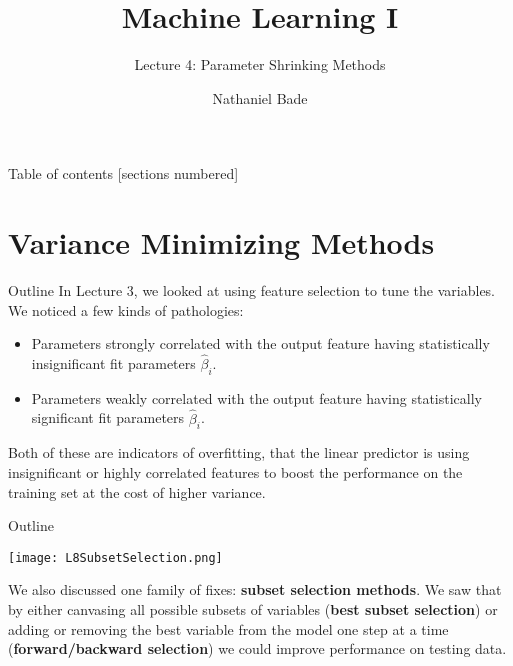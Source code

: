 \documentclass[10pt, table, dvipsnames,xcdraw,handout]{beamer}
\title{Machine Learning I}
\subtitle{Lecture 4: Parameter Shrinking Methods}
\date{}
\author{Nathaniel Bade}
\institute{Northeastern University Department of Mathematics}
\begin{document}
\maketitle

\begin{frame}{Table of contents}
  [sections numbered]
  \tableofcontents[hideallsubsections]
\end{frame}




\section{Variance Minimizing Methods}


\begin{frame}[fragile]{Outline} 
In Lecture 3, we looked at using feature selection to tune the variables. We noticed a few kinds of pathologies: 

\begin{itemize}
\item[] Parameters strongly correlated with the output feature having statistically insignificant fit parameters $\hat\beta_i$.\pause
\item[] Parameters weakly correlated with the output feature having statistically significant fit parameters $\hat\beta_i$.\pause
\end{itemize}
Both of these are indicators of overfitting, that the linear predictor is using insignificant or highly correlated features to boost the performance on the training set at the cost of higher variance. 
\end{frame}



\begin{frame}[fragile]{Outline} 
  \begin{minipage}[t][0.5\textheight][t]{\textwidth}
	\centering \texttt{[image: L8SubsetSelection.png]} 
  \end{minipage}
  \vfill
\begin{minipage}[t][0.5\textheight][t]{\textwidth}
We also discussed one family of fixes: \textbf{subset selection methods}. We saw that by either canvasing all possible subsets of variables (\textbf{best subset selection}) or adding or removing the best variable from the model one step at a time (\textbf{forward/backward selection}) we could improve performance on testing data. 
\end{minipage}

\end{frame}
\end{document}
